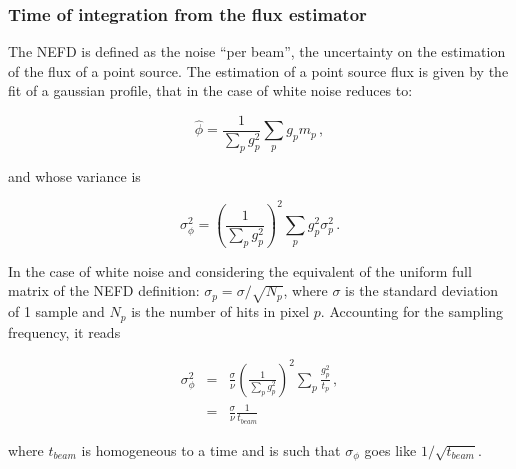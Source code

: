 \subsubsection{Time of integration from the flux estimator}

The NEFD is defined as the noise ``per beam'', the uncertainty on the estimation
of the flux of a point source. The estimation of a point source flux is given by
the fit of a gaussian profile, that in the case of white noise reduces to:

\begin{equation}
\hat{\phi} = \frac{1}{\sum_p g_p^2}\sum_p g_p m_p\,,
\label{eq:phi_def}
\end{equation}

and whose variance is

\begin{equation}
\sigma_\phi^2 = \left(\frac{1}{\sum_p g_p^2}\right)^2\sum_p g_p^2\sigma_p^2\,.
\label{eq:sigma_phi_def}
\end{equation}

In the case of white noise and considering the equivalent of the
uniform full matrix of the NEFD definition: $\sigma_p = \sigma/\sqrt{N_p}$,
where $\sigma$ is the standard deviation of 1 sample and $N_p$ is the number of
hits in pixel $p$. Accounting for the sampling frequency, it reads

\begin{eqnarray}
\sigma_\phi^2 &=& \frac{\sigma}{\nu}\left(\frac{1}{\sum_p g_p^2}\right)^2\sum_p \frac{g_p^2}{t_p}\,, \nonumber\\
&=&\frac{\sigma}{\nu}\frac{1}{t_{beam}}\,
\label{eq:sigma_phi_def_2}
\end{eqnarray}

where $t_{beam}$ is homogeneous to a time and is such that $\sigma_\phi$ goes
like $1/\sqrt{t_{beam}}$.\\



